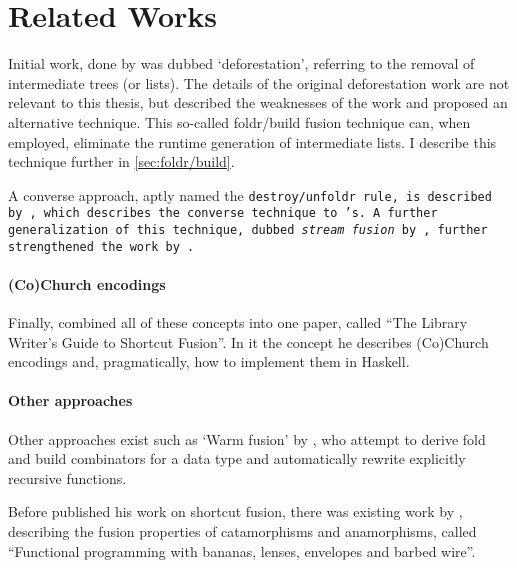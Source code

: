 \section{Related Works}\label{sec:related}
Initial work, done by \cite{Wadler1984,Wadler1986,Wadler1990} was dubbed `deforestation', referring to the removal of intermediate trees (or lists).
The details of the original deforestation work are not relevant to this thesis, but \cite{Gill1993} described the weaknesses of the work and proposed an alternative technique.
This so-called foldr/build fusion technique can, when employed, eliminate the runtime generation of intermediate lists.
I describe this technique further in \autoref{sec:foldr/build}.

A converse approach, aptly named the \tt{destroy/unfoldr} rule, is described by \cite{Svenningsson2002}, which describes the converse technique to \cite{Gill1993}'s.
A further generalization of this technique, dubbed \textit{stream fusion} by \cite{Coutts2007}, further strengthened the work by \cite{Svenningsson2002}.

\paragraph{(Co)Church encodings}
Finally, \cite{Harper2011} combined all of these concepts into one paper, called ``The Library Writer's Guide to Shortcut Fusion''.
In it the concept he describes (Co)Church encodings and, pragmatically, how to implement them in Haskell.

\paragraph{Other approaches}
Other approaches exist such as `Warm fusion' by \cite{Launchbury1995}, who attempt to derive fold and build combinators for a data type and automatically rewrite explicitly recursive functions.

Before \cite{Gill1993} published his work on shortcut fusion, there was existing work by \cite{Meijer1991}, describing the fusion properties of catamorphisms and anamorphisms, called ``Functional programming with bananas, lenses, envelopes and barbed wire''.